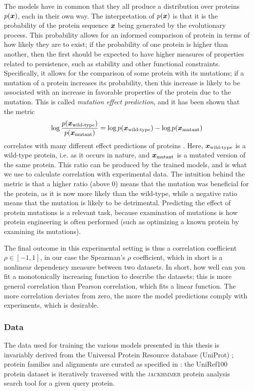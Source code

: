 The models have in common that they all produce a distribution over proteins $p(\bm{ x })$, each in their own way. The interpretation of $p(\bm{ x })$ is that it is the probability of the protein sequence $\bm{ x }$ being generated by the evolutionary process. This probability allows for an informed comparison of protein in terms of how likely they are to exist; if the probability of one protein is higher than another, then the first should be expected to have higher measures of properties related to persistence, such as stability and other functional constraints. Specifically, it allows for the comparison of some protein with its mutations; if a mutation of a protein increases its probability, then this increase is likely to be associated with an increase in favorable properties of the protein due to the mutation. This is called \textit{mutation effect prediction}, and it has been shown that the metric
\[\log \frac{p(\bm{ x }_{\text{wild-type}})}{p(\bm{ x }_{\text{mutant}})} = \log p(\bm{ x }_{\text{wild-type}}) - \log p(\bm{ x }_{\text{mutant}})\]
correlates with many different effect predictions of proteins \cite{hopf2017mutation}. Here, $\bm{ x }_{\text{wild-type}}$ is a wild-type protein, i.e. as it occurs in nature, and $\bm{ x }_{\text{mutant}}$ is a mutated version of the same protein. This ratio can be produced by the trained models, and is what we use to calculate correlation with experimental data. The intuition behind the metric is that a higher ratio (above 0) means that the mutation was beneficial for the protein, as it is now more likely than the wild-type, while a negative ratio means that the mutation is likely to be detrimental. Predicting the effect of protein mutations is a relevant task, because examination of mutations is how protein engineering is often performed (such as optimizing a known protein by examining its mutations).

The final outcome in this experimental setting is thus a correlation coefficient $\rho \in [-1, 1]$, in our case the Spearman's $\rho$ coefficient, which in short is a nonlinear dependency measure between two datasets. In short, how well can you fit a monotonically increasing function to describe the datasets; this is more general correlation than Pearson correlation, which fits a linear function. The more correlation deviates from zero, the more the model predictions comply with experiments, which is desirable.

\subsubsection{Data}
\label{sec:data}
The data used for training the various models presented in this thesis is invariably derived from the Universal Protein Resource database (UniProt) \cite{uniprot2007universal}; protein families and alignments are curated as specified in \cite{riesselman2018deep}: the UniRef100 protein dataset is iteratively traversed with the 
\textsc{jackhmmer} protein analysis search tool \cite{eddy1992hmmer} for a given query protein.

